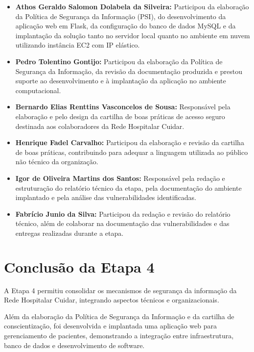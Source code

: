 \documentclass[12pt,a4paper,oneside]{report}
\begin{document}
\begin{itemize}[label=\color{pucblue}$\bullet$]
    \item \textbf{Athos Geraldo Salomon Dolabela da Silveira:} Participou da elaboração da Política de Segurança da Informação (PSI), do desenvolvimento da aplicação web em Flask, da configuração do banco de dados MySQL e da implantação da solução tanto no servidor local quanto no ambiente em nuvem utilizando instância EC2 com IP elástico.

    \item \textbf{Pedro Tolentino Gontijo:} Participou da elaboração da Política de Segurança da Informação, da revisão da documentação produzida e prestou suporte ao desenvolvimento e à implantação da aplicação no ambiente computacional.

    \item \textbf{Bernardo Elias Renttins Vasconcelos de Sousa:} Responsável pela elaboração e pelo design da cartilha de boas práticas de acesso seguro destinada aos colaboradores da Rede Hospitalar Cuidar.

    \item \textbf{Henrique Fadel Carvalho:} Participou da elaboração e revisão da cartilha de boas práticas, contribuindo para adequar a linguagem utilizada ao público não técnico da organização.

    \item \textbf{Igor de Oliveira Martins dos Santos:} Responsável pela redação e estruturação do relatório técnico da etapa, pela documentação do ambiente implantado e pela análise das vulnerabilidades identificadas.

    \item \textbf{Fabrício Junio da Silva:} Participou da redação e revisão do relatório técnico, além de colaborar na documentação das vulnerabilidades e das entregas realizadas durante a etapa.
\end{itemize}

\section{Conclusão da Etapa 4}

A Etapa 4 permitiu consolidar os mecanismos de segurança da informação da Rede Hospitalar Cuidar, integrando aspectos técnicos e organizacionais.

Além da elaboração da Política de Segurança da Informação e da cartilha de conscientização, foi desenvolvida e implantada uma aplicação web para gerenciamento de pacientes, demonstrando a integração entre infraestrutura, banco de dados e desenvolvimento de software.
\end{document}
